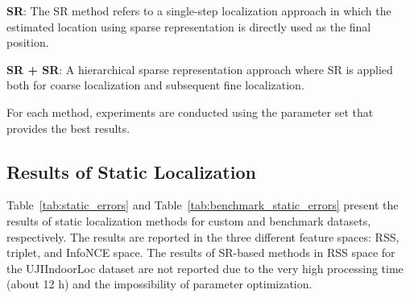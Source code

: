 \documentclass[journal,twoside,web]{ieeecolor}
\begin{document}
 \textbf{SR}: The SR method refers to a single-step localization approach in which the estimated location using sparse representation is directly used as the final position.

 \textbf{SR + SR}: A hierarchical sparse representation approach where SR is applied both for coarse localization and subsequent fine localization.
 
For each method, experiments are conducted using the parameter set that provides the best results.
\subsection{Results of Static Localization}
Table~\ref{tab:static_errors} and Table~\ref{tab:benchmark_static_errors} present the results of static localization methods for custom and benchmark datasets, respectively. The results are reported in the three different feature spaces:  RSS, triplet, and InfoNCE space. The results of SR-based methods in RSS space for the UJIIndoorLoc dataset are not reported due to the very high processing time (about 12 h) and the impossibility of parameter optimization.
\end{document}
